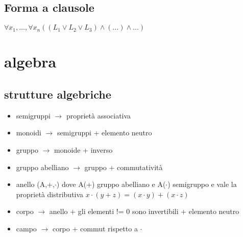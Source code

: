 \documentclass{article}
\begin{document}
\begin{multicols*}{3}
 		\subsection{Forma a clausole}
 		\(\forall x_1,..., \forall x_n ((L_1\lor L_2 \lor L_3)\land (...) \land  ...)\)
 		\section{algebra}
 		\subsection{strutture algebriche}
 		\begin{itemize}
 			\setlength\itemsep{0.1mm}
 			\item semigruppi \(\rightarrow\) proprietà associativa
 			\item monoidi \(\rightarrow\) semigruppi + elemento neutro
 			\item gruppo \(\rightarrow\) monoide + inverso
 			\item gruppo abelliano \(\rightarrow\) gruppo + commutatività
 			\item anello (A,+,\(\cdot\)) dove A(+) gruppo abelliano e A(\(\cdot\)) semigruppo e vale la proprietà distributiva \(x\cdot(y+z) = (x\cdot y )+(x\cdot z)\)
 			\item corpo \(\rightarrow\) anello + gli elementi != 0 sono invertibili + elemento neutro
 			\item campo \(\rightarrow\) corpo + commut rispetto a \(\cdot\)
 			 
 		\end{itemize}
	 	
	 	
		\end{multicols*}
		
		
		
		
		
\end{document}
